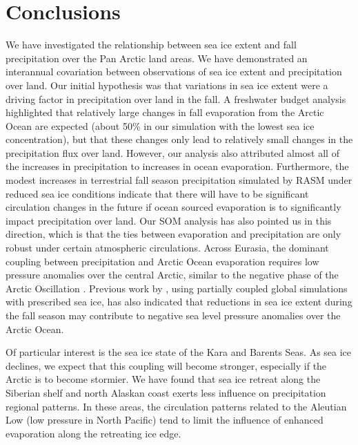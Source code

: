 \section{Conclusions}
\label{sec:conclusions_ch5}
We have investigated the relationship between sea ice extent and fall precipitation over the Pan Arctic land areas.
We have demonstrated an interannual covariation between observations of sea ice extent and precipitation over land.
Our initial hypothesis was that variations in sea ice extent were a driving factor in precipitation over land in the fall.
A freshwater budget analysis highlighted that relatively large changes in fall evaporation from the Arctic Ocean are expected (about 50\% in our simulation with the lowest sea ice concentration), but that these changes only lead to relatively small changes in the precipitation flux over land.
However, our analysis also attributed almost all of the increases in precipitation to increases in ocean evaporation.
Furthermore, the modest increases in terrestrial fall season precipitation simulated by RASM under reduced sea ice conditions indicate that there will have to be significant circulation changes in the future if ocean sourced evaporation is to significantly impact precipitation over land.
Our SOM analysis has also pointed us in this direction, which is that the ties between evaporation and precipitation are only robust under certain atmospheric circulations.
Across Eurasia, the dominant coupling between precipitation and Arctic Ocean evaporation requires low pressure anomalies over the central Arctic, similar to the negative phase of the Arctic Oscillation \citep{Thompson_1998}.
Previous work by \citet{Cassano_2014}, using partially coupled global simulations with prescribed sea ice, has also indicated that reductions in sea ice extent during the fall season may contribute to negative sea level pressure anomalies over the Arctic Ocean.

Of particular interest is the sea ice state of the Kara and Barents Seas.
As sea ice declines, we expect that this coupling will become stronger, especially if the Arctic is to become stormier.
We have found that sea ice retreat along the Siberian shelf and north Alaskan coast exerts less influence on precipitation regional patterns.
In these areas, the circulation patterns related to the Aleutian Low (low pressure in North Pacific) tend to limit the influence of enhanced evaporation along the retreating ice edge.
